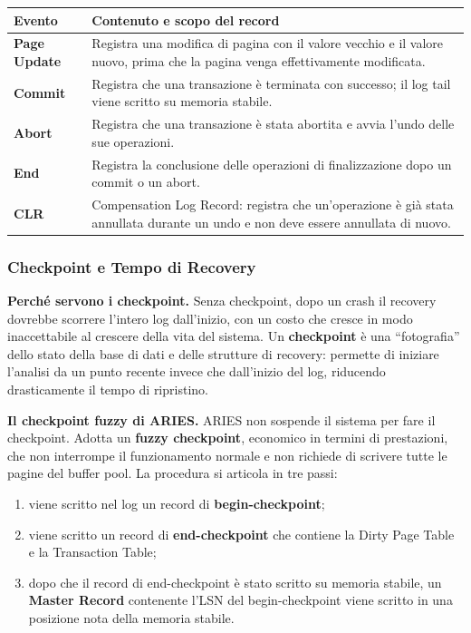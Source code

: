\documentclass[12pt]{extarticle}
\begin{document}
\begin{center}
\small
\begin{tabular}{@{}lp{9.6cm}@{}}
    \toprule
    \textbf{Evento} & \textbf{Contenuto e scopo del record} \\
    \midrule
    \textbf{Page Update} & Registra una modifica di pagina con il valore vecchio e il valore nuovo, prima che la pagina venga effettivamente modificata. \\
    \addlinespace
    \textbf{Commit} & Registra che una transazione è terminata con successo; il log tail viene scritto su memoria stabile. \\
    \addlinespace
    \textbf{Abort} & Registra che una transazione è stata abortita e avvia l'undo delle sue operazioni. \\
    \addlinespace
    \textbf{End} & Registra la conclusione delle operazioni di finalizzazione dopo un commit o un abort. \\
    \addlinespace
    \textbf{CLR} & Compensation Log Record: registra che un'operazione è già stata annullata durante un undo e non deve essere annullata di nuovo. \\
    \bottomrule
\end{tabular}
\end{center}

\subsubsection{Checkpoint e Tempo di Recovery}

\noindent \textbf{Perché servono i checkpoint.} Senza checkpoint, dopo un crash il recovery dovrebbe scorrere l'intero log dall'inizio, con un costo che cresce in modo inaccettabile al crescere della vita del sistema. Un \textbf{checkpoint} è una ``fotografia'' dello stato della base di dati e delle strutture di recovery: permette di iniziare l'analisi da un punto recente invece che dall'inizio del log, riducendo drasticamente il tempo di ripristino.

\medskip
\noindent \textbf{Il checkpoint fuzzy di ARIES.} ARIES non sospende il sistema per fare il checkpoint. Adotta un \textbf{fuzzy checkpoint}, economico in termini di prestazioni, che non interrompe il funzionamento normale e non richiede di scrivere tutte le pagine del buffer pool. La procedura si articola in tre passi:
\begin{enumerate}
    \item viene scritto nel log un record di \textbf{begin-checkpoint};
    \item viene scritto un record di \textbf{end-checkpoint} che contiene la Dirty Page Table e la Transaction Table;
    \item dopo che il record di end-checkpoint è stato scritto su memoria stabile, un \textbf{Master Record} contenente l'LSN del begin-checkpoint viene scritto in una posizione nota della memoria stabile.
\end{enumerate}
\end{document}
